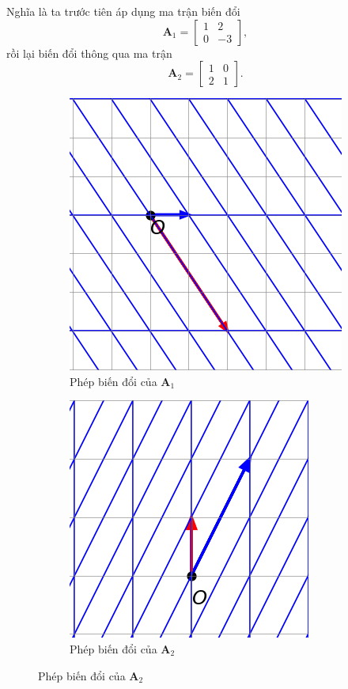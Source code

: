 Nghĩa là ta trước tiên áp dụng ma trận biến đổi 
\[
\mathbf{A}_1 =
\begin{bmatrix}
    1&2\\0&-3
 \end{bmatrix},
\]
rồi lại biến đổi thông qua ma trận 
\[
\mathbf{A}_2 =
\begin{bmatrix}
    1&0\\2&1
 \end{bmatrix}.
\]
 \begin{figure}[H]
    \centering
    \begin{subfigure}[t]{0.48\textwidth}
        \centering
        \includegraphics[width=0.9\linewidth]{Tuan2/Figures/LT4.png}
        \caption{Phép biến đổi của \(\mathbf{A}_1\)}
    \end{subfigure}
    \hfill
    \begin{subfigure}[t]{0.48\textwidth}
        \centering
        \includegraphics[width=0.9\linewidth]{Tuan2/Figures/LT5.png}
        \caption{Phép biến đổi của \(\mathbf{A}_2\)}
    \end{subfigure}
 \end{figure}
